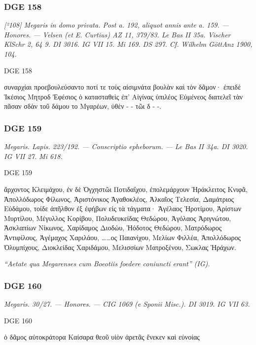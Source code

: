 \hrulefill

\subsubsection{DGE 158}
\textit{[²108] Megaris in domo privata. Post a. 192, aliquot annis ante a. 159. — Honores. — Velsen (et E. Curtius) AZ 11, 379/83. Le Bas II 35a. Vischer KlSchr 2, 64 9. DI 3016. IG VII 15. Mi 169. DS 297. Cf. Wilhelm GöttAnz 1900, 104.}
\begin{versi}{DGE 158}
\begin{greek}
συναρχίαι προεβουλεύσαντο ποτί τε τοὺς αἰσιμνάτα βουλὰν καὶ τὸν δᾶμον· ἐπειδὲ Ἱκέσιος Μητροδ Ἐφέσιος ὁ κατασταθεὶς ἐπ’ Αἰγίνας ὑπιλέος Εὐμένεος διατελεῖ τὰν πᾶσαν σδὰν  τοῦ δάμου το Μγαρέων, ὐθὲν  - - τῶι δ - -.
\end{greek}
\end{versi}

\hrulefill

\subsubsection{DGE 159}
\textit{Megaris. Lapis. 223/192. — Conscriptio epheborum. — Le Bas II 34a. DI 3020. IG VII 27. Mi 618.}
\begin{versi}{DGE 159}
\begin{greek}
ἄρχοντος Κλειμάχου, {\verso[1]} ἐν δὲ Ὀγχηστῶι Ποτιδαΐχου, {\verso} ἐπολεμάρχουν {\verso} Ἡράκλειτος Κνιφᾶ, Ἀπολλόδωρος Φίλωνος, {\verso} Ἀριστόνικος Ἀγαθοκλέος, {\verso} Ἀλκαῖος Τελεσία, {\verso} Δαμάτριος Εὐδάμου, {\verso} τοίδε ἀπῆλθον ἐξ ἐφήβων εἰς τὰ τάγματα· Ἀγέλαος Ἡροτίμου, {\verso} Ἀρίστων Μυρτίλου, {\verso} Μέγυλλος Κορίβου, {\verso} Πολυδευκείδας Θεδώρου, Ἀγόλαος Ἀριγνώτου, {\verso} Ἀσκλαπίων Νίκωνος, {\verso} Χαρίδαμος Διοδώυ, {\verso} Ἡόδοτος Θεδώρου, {\verso} Ματρόδωρος Ἀντιφίλους, Ἀγέμαχος Χαριλάου, {\verso} ……ος Παιανίχου, {\verso} Μελίων Φιλλέα, {\verso} Ἀπολλόδωρος Ὀλυμπίχους, {\verso} Διοκλείδας Χαριδάμου, Μελισσίων Ματροξένου, {\verso} Σωκλας Ἡράχων.
\end{greek}
\end{versi}
\textit{``Aetate qua Megarenses cum Boeotiis foedere coniuncti erant'' (IG).}

\hrulefill

\subsubsection{DGE 160}
\textit{Megaris. 30/27. — Honores. — CIG 1069 (e Sponii Misc.). DI 3019. IG VII 63.}
\begin{versi}{DGE 160}
\begin{greek}
ὁ δᾶμος {\verso[1]} αὐτοκράτορα Καί{\verso}σαρα θεοῦ υἱὸν {\verso} ἀρετᾶς ἕνεκεν {\verso} καὶ εὐνοίας
\end{greek}
\end{versi}

